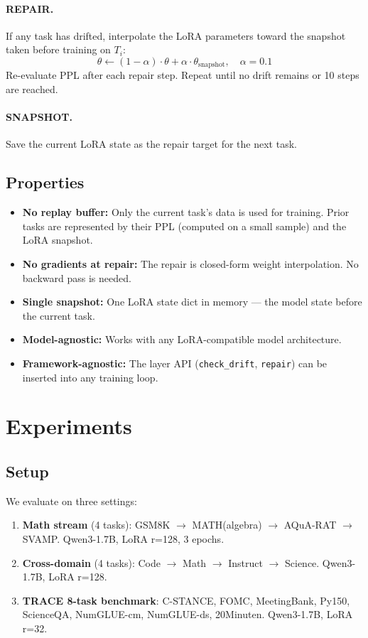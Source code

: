 \documentclass{article}
\begin{document}
\paragraph{REPAIR.} If any task has drifted, interpolate the LoRA parameters toward the snapshot taken before training on $T_i$:
$$\theta \leftarrow (1-\alpha) \cdot \theta + \alpha \cdot \theta_{\text{snapshot}}, \quad \alpha = 0.1$$
Re-evaluate PPL after each repair step. Repeat until no drift remains or 10 steps are reached.

\paragraph{SNAPSHOT.} Save the current LoRA state as the repair target for the next task.

\subsection{Properties}

\begin{itemize}
    \item \textbf{No replay buffer:} Only the current task's data is used for training. Prior tasks are represented by their PPL (computed on a small sample) and the LoRA snapshot.
    \item \textbf{No gradients at repair:} The repair is closed-form weight interpolation. No backward pass is needed.
    \item \textbf{Single snapshot:} One LoRA state dict in memory — the model state before the current task.
    \item \textbf{Model-agnostic:} Works with any LoRA-compatible model architecture.
    \item \textbf{Framework-agnostic:} The layer API (\texttt{check\_drift}, \texttt{repair}) can be inserted into any training loop.
\end{itemize}

\section{Experiments}

\subsection{Setup}

We evaluate on three settings:
\begin{enumerate}
    \item \textbf{Math stream} (4 tasks): GSM8K $\to$ MATH(algebra) $\to$ AQuA-RAT $\to$ SVAMP. Qwen3-1.7B, LoRA r=128, 3 epochs.
    \item \textbf{Cross-domain} (4 tasks): Code $\to$ Math $\to$ Instruct $\to$ Science. Qwen3-1.7B, LoRA r=128.
    \item \textbf{TRACE 8-task benchmark}: C-STANCE, FOMC, MeetingBank, Py150, ScienceQA, NumGLUE-cm, NumGLUE-ds, 20Minuten. Qwen3-1.7B, LoRA r=32.
\end{enumerate}
\end{document}
